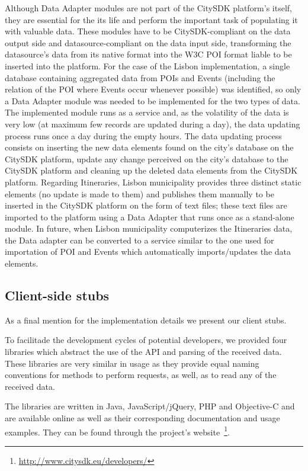 \documentclass[times]{ettauth}
\begin{document}
Although Data Adapter modules are not part of the CitySDK platform's itself, they are essential for the its life and perform the important task of populating it with valuable data. 
These modules have to be CitySDK-compliant on the data output side and datasource-compliant on the data input side, transforming the datasource's data from its native format into the W3C POI format liable to be inserted into the platform. 
For the case of the Lisbon implementation, a single database containing aggregated data from \acp{POI} and Events (including the relation of the \ac{POI} where Events occur whenever possible) was identified, so only a Data Adapter module was needed to be implemented for the two types of data. 
The implemented module runs as a service and, as the volatility of the data is very low (at maximum few records are updated during a day), the data updating process runs once a day during the empty hours. 
The data updating process consists on inserting the new data elements found on the city's database on the CitySDK platform, update any change perceived on the city's database to the CitySDK platform and cleaning up the deleted data elements from the CitySDK platform. 
Regarding Itineraries, Lisbon municipality provides three distinct static elements (no update is made to them) and publishes them manually to be inserted in the CitySDK platform on the form of text files; these text files are imported to the platform using a Data Adapter that runs once as a stand-alone module. 
In future, when Lisbon municipality computerizes the Itineraries data, the Data adapter can be converted to a service similar to the one used for importation of \ac{POI} and Events which automatically imports/updates the data elements.

\subsection{Client-side stubs}
As a final mention for the implementation details we present our client stubs. 

To facilitade the development cycles of potential developers, we provided four libraries which abstract the use of the API and parsing of the received data. These libraries are very similar in usage as they provide equal naming conventions for methods to perform requests, as well, as to read any of the received data.

The libraries are written in Java, JavaScript/jQuery, PHP and Objective-C and are available online as well as their corresponding documentation and usage examples. They can be found through the project's website~\footnote{\url{http://www.citysdk.eu/developers/}}.
\end{document}
